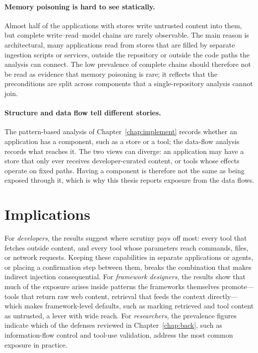 \paragraph{Memory poisoning is hard to see statically.} Almost half of the applications with stores write untrusted content into them, but complete write--read--model chains are rarely observable. The main reason is architectural, many applications read from stores that are filled by separate ingestion scripts or services, outside the repository or outside the code paths the analysis can connect. The low prevalence of complete chains should therefore not be read as evidence that memory poisoning is rare; it reflects that the preconditions are split across components that a single-repository analysis cannot join.

\paragraph{Structure and data flow tell different stories.} The pattern-based analysis of Chapter~\ref{chap:implement} records whether an application has a component, such as a store or a tool; the data-flow analysis records what reaches it. The two views can diverge: an application may have a store that only ever receives developer-curated content, or tools whose effects operate on fixed paths. Having a component is therefore not the same as being exposed through it, which is why this thesis reports exposure from the data flows.

\section{Implications}
\label{sec:disc-implications}

For \emph{developers}, the results suggest where scrutiny pays off most: every tool that fetches outside content, and every tool whose parameters reach commands, files, or network requests. Keeping these capabilities in separate applications or agents, or placing a confirmation step between them, breaks the combination that makes indirect injection consequential. For \emph{framework designers}, the results show that much of the exposure arises inside patterns the frameworks themselves promote---tools that return raw web content, retrieval that feeds the context directly---which makes framework-level defaults, such as marking retrieved and tool content as untrusted, a lever with wide reach. For \emph{researchers}, the prevalence figures indicate which of the defenses reviewed in Chapter~\ref{chap:back}, such as information-flow control and tool-use validation, address the most common exposure in practice.

